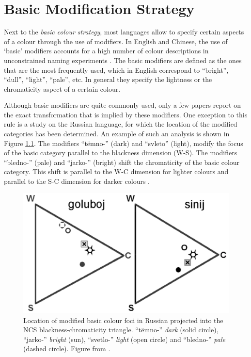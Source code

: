 \chapter{Basic Modification Strategy}
\label{s:basic-modification-strategy}
\label{s:last-strategy}

Next to the \emph{basic colour strategy}, most languages allow to
specify certain aspects of a colour through the use of modifiers. In
English and Chinese, the use of `basic' modifiers accounts for a high
number of colour descriptions in unconstrained naming experiments
\citep{simpson91sex, lin01unconstrained}. The basic modifiers are
defined as the ones that are the most frequently used, which in
English correspond to ``bright'', ``dull'', ``light'', ``pale'',
etc. In general they specify the lightness or the chromaticity aspect
of a certain colour.

Although basic modifiers are quite commonly used, only a few
papers report on the exact transformation that is implied by these
modifiers. One exception to this rule is a study on the Russian
language, for which the location of the modified categories has been
determined. An example of such an analysis is shown in Figure
\ref{f:ams-russian-diagram}. The modifiers ``t\"emno-'' (dark) and
``svleto'' (light), modify the focus of the basic category parallel to
the blackness dimension (W-S). The modifiers ``bledno-'' (pale) and
``jarko-'' (bright) shift the chromaticity of the basic colour
category. This shift is parallel to the W-C dimension for lighter
colours and parallel to the S-C dimension for darker colours
\citep{safuanova07russian}.

\begin{figure}[htpb]
  \centering
  \includegraphics[width=.5\textwidth]{./achromatic/figures/russian-diagram.pdf}
  \caption[Location of modified basic colour foci in Russian]{Location
    of modified basic colour foci in Russian projected into the NCS
    blackness-chromaticity triangle. ``t\"emno-'' \emph{dark} (solid
    circle), ``jarko-'' \emph{bright} (sun), ``svetlo-'' \emph{light}
    (open circle) and ``bledno-'' \emph{pale} (dashed circle). Figure
    from \cite{paramei05singing}.}
  \label{f:ams-russian-diagram}
\end{figure}

